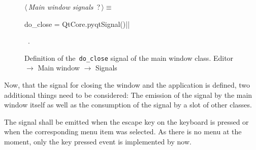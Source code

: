 \documentclass[%
    a4paper,    %
    justified,  %
    nobib,      %
    openany     %
]{tufte-book}
\begin{document}
\begin{figure}
\begin{flushleft} \small
\begin{minipage}{\linewidth}\label{scrap16}\raggedright\small
{} $\langle\,${\itshape Main window signals}\nobreak\ {\footnotesize {?}}$\,\rangle\equiv$
\vspace{-1ex}
\begin{pythoncode}
do_close = QtCore.pyqtSignal()|\NWsep|
\end{pythoncode}
\vspace{1.5ex}
\footnotesize
\begin{list}{}{\setlength{\itemsep}{-\parsep}\setlength{\itemindent}{-\leftmargin}}
\item \NWtxtMacroRefIn\ .

\item{}
\end{list}
\end{minipage}\vspace{4ex}
\end{flushleft}
\caption{Definition of the~\texttt{do\_close} signal of the main window class.
  \newline{}\newline{}Editor $\rightarrow$ Main window $\rightarrow$ Signals}
\label{editor:lst:main-window:signals}
\end{figure}

Now, that the signal for closing the window and the application is defined, two
additional things need to be considered: The emission of the signal by
the main window itself as well as the consumption of the signal by a slot of
other classes.

The signal shall be emitted when the escape key on the keyboard is pressed or
when the corresponding menu item was selected. As there is no menu at the
moment, only the key pressed event is implemented by now.
\end{document}
